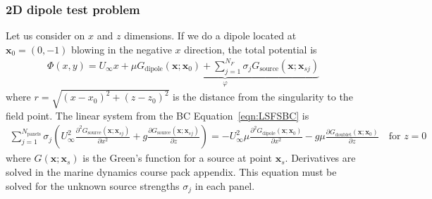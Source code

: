 \documentclass[10pt]{article}
\newcommand{\pp}[2]{\frac{\partial #1}{\partial #2}}
\newcommand{\ppt}[2]{\frac{\partial^2 #1}{\partial #2^2}}
\newcommand{\mbf}[1]{\mathbf{#1}}
\newcommand{\be}{\begin{eqnarray}}
\newcommand{\ee}{\end{eqnarray}}
\newcommand{\beq}{\begin{equation}\begin{aligned}}
\newcommand{\eeq}{\end{aligned}\end{equation}}
\newcommand{\Uinf}{U_{\infty}}
\newcommand{\tn}[1]{\textrm{#1}}
\begin{document}
% 

\subsubsection{2D dipole test problem}
Let us consider on $x$ and $z$ dimensions.
If we do a dipole located at $\mbf{x}_0=(0,-1)$ blowing in the negative $x$ direction, the total potential is
\be
\label{eqn:MovingDipole}
\Phi(x,y) = \Uinf x
+
\underbrace{
    \mu G_{\tn{dipole}}(\mbf{x}; \mbf{x}_0)
    +
    \sum_{j=1}^{N_F} {\sigma_j} G_{\tn{source}}(\mbf{x}; \mbf{x}_{sj})
}_{\varphi}
\ee
where $r=\sqrt{(x-x_0)^2 + (z- z_0)^2}$ is the distance from the singularity to the field point.
The linear system from the BC Equation~\eqref{eqn:LSFSBC} is
\beq
\sum_{j=1}^{N_{\tn{panels}}}
\sigma_j
\left(
\Uinf^2
\ppt{G_{\tn{source}}\left(\mbf{x}; \mbf{x}_{sj}\right)}{x}
+ g\pp{G_{\tn{source}}\left(\mbf{x}; \mbf{x}_{sj}\right)}{z}
\right)
=
-\Uinf^2 \mu
\ppt{G_{\tn{dipole}}\left(\mbf{x}; \mbf{x}_0\right)}{x}
- g \mu
\pp{G_{\tn{doublet}}(\mbf{x}; \mbf{x}_0)}{z}
\quad \tn{for } z = 0
\eeq
where $G\left(\mbf{x}; \mbf{x}_s\right)$ is the Green's function for a source at point $\mbf{x}_s$.
Derivatives are solved in the marine dynamics course pack appendix.
This equation must be solved for the unknown source strengths $\sigma_j$ in each panel.
\end{document}
